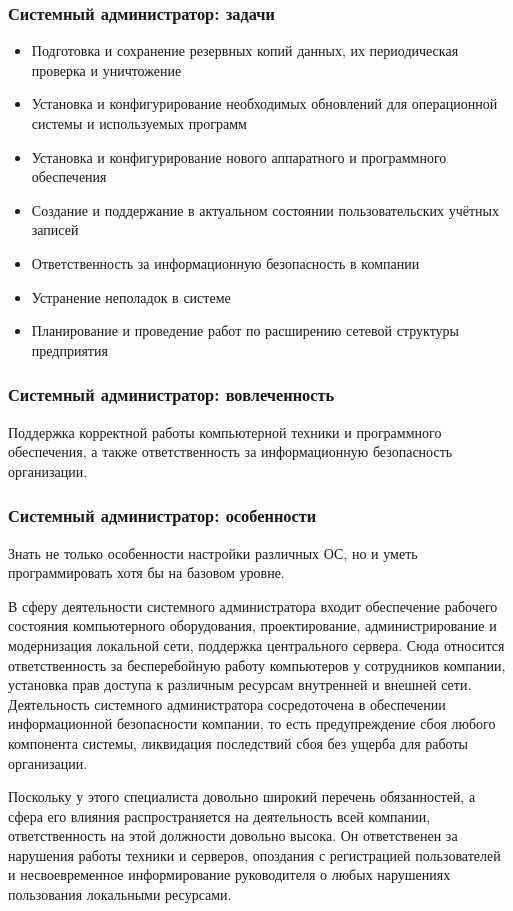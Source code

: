 \documentclass{../industrial-development}
\begin{document}
	\begin{frame} \frametitle{Системный администратор: задачи}
		\begin{itemize}
			\item Подготовка и сохранение резервных копий данных, их периодическая проверка и уничтожение
			\item Установка и конфигурирование необходимых обновлений для операционной системы и используемых программ
			\item Установка и конфигурирование нового аппаратного и программного обеспечения
			\item Создание и поддержание в актуальном состоянии пользовательских учётных записей
			\item Ответственность за информационную безопасность в компании
			\item Устранение неполадок в системе
			\item Планирование и проведение работ по расширению сетевой структуры предприятия
		\end{itemize}
	\end{frame}
	\begin{frame} \frametitle{Системный администратор: вовлеченность}
		Поддержка корректной работы компьютерной техники и программного обеспечения, а также ответственность за информационную безопасность организации.
	\end{frame}
	
	\begin{frame} \frametitle{Системный администратор: особенности}
		Знать не только особенности настройки различных ОС, но и уметь программировать хотя бы на базовом уровне.
	\end{frame}

	\lecturenotes
		В сферу деятельности системного администратора входит обеспечение рабочего состояния компьютерного оборудования, проектирование, администрирование и модернизация локальной сети, поддержка центрального сервера. Сюда относится ответственность за бесперебойную работу компьютеров у сотрудников компании, установка прав доступа к различным ресурсам внутренней и внешней сети. Деятельность системного администратора сосредоточена в обеспечении информационной безопасности компании, то есть предупреждение сбоя любого компонента системы, ликвидация последствий сбоя без ущерба для работы организации. 
		
		Поскольку у этого специалиста довольно широкий перечень обязанностей, а сфера его влияния распространяется на деятельность всей компании, ответственность на этой должности довольно высока. Он ответственен за нарушения работы техники и серверов, опоздания с регистрацией пользователей и несвоевременное информирование руководителя о любых нарушениях пользования локальными ресурсами.
	
\end{document}
